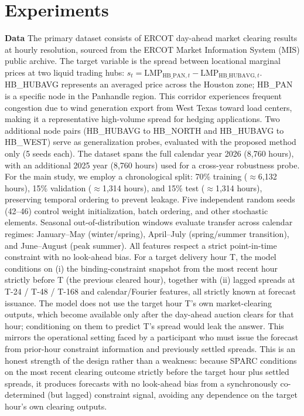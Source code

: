 \documentclass[twoside]{article}
\begin{document}
\section{Experiments}
\textbf{Data}
The primary dataset consists of ERCOT day-ahead market clearing results at hourly resolution, sourced from the ERCOT Market Information System (MIS) public archive. The target variable is the spread between locational marginal prices at two liquid trading hubs: $s_t = \text{LMP}_{\text{HB\_PAN},t} - \text{LMP}_{\text{HB\_HUBAVG},t}$. HB\_HUBAVG represents an averaged price across the Houston zone; HB\_PAN is a specific node in the Panhandle region. This corridor experiences frequent congestion due to wind generation export from West Texas toward load centers, making it a representative high-volume spread for hedging applications. Two additional node pairs (HB\_HUBAVG to HB\_NORTH and HB\_HUBAVG to HB\_WEST) serve as generalization probes, evaluated with the proposed method only (5 seeds each).
The dataset spans the full calendar year 2026 (8,760 hours), with an additional 2025 year (8,760 hours) used for a cross-year robustness probe. For the main study, we employ a chronological split: 70\% training ($\approx$6,132 hours), 15\% validation ($\approx$1,314 hours), and 15\% test ($\approx$1,314 hours), preserving temporal ordering to prevent leakage. Five independent random seeds (42--46) control weight initialization, batch ordering, and other stochastic elements. Seasonal out-of-distribution windows evaluate transfer across calendar regimes: January--May (winter/spring), April--July (spring/summer transition), and June--August (peak summer). All features respect a strict point-in-time constraint with no look-ahead bias. For a target delivery hour T, the model conditions on (i) the binding-constraint snapshot from the most recent hour strictly before T (the previous cleared hour), together with (ii) lagged spreads at T-24 / T-48 / T-168 and calendar/Fourier features, all strictly known at forecast issuance. The model does not use the target hour T's own market-clearing outputs, which become available only after the day-ahead auction clears for that hour; conditioning on them to predict T's spread would leak the answer. This mirrors the operational setting faced by a participant who must issue the forecast from prior-hour constraint information and previously settled spreads. This is an honest strength of the design rather than a weakness: because SPARC conditions on the most recent clearing outcome strictly before the target hour plus settled spreads, it produces forecasts with no look-ahead bias from a synchronously co-determined (but lagged) constraint signal, avoiding any dependence on the target hour's own clearing outputs.
\end{document}
